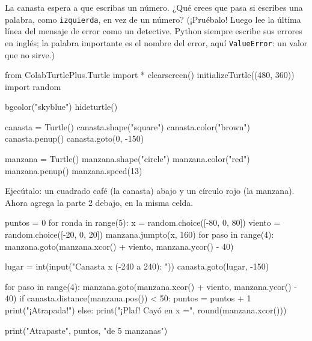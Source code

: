 \begin{think}
La canasta espera a que escribas un número. ¿Qué crees que pasa si escribes una palabra, como \texttt{izquierda}, en vez de un número? (¡Pruébalo! Luego lee la última línea del mensaje de error como un detective. Python siempre escribe sus errores en inglés; la palabra importante es el nombre del error, aquí \texttt{ValueError}: un valor que no sirve.)
\end{think}

\begin{typethis}
from ColabTurtlePlus.Turtle import *
clearscreen()
initializeTurtle((480, 360))
import random

bgcolor("skyblue")
hideturtle()

canasta = Turtle()
canasta.shape("square")
canasta.color("brown")
canasta.penup()
canasta.goto(0, -150)

manzana = Turtle()
manzana.shape("circle")
manzana.color("red")
manzana.penup()
manzana.speed(13)
\end{typethis}

Ejecútalo: un cuadrado café (la canasta) abajo y un círculo rojo (la manzana). Ahora agrega la parte 2 debajo, en la misma celda.

\lstset{firstnumber=21}
\begin{typethis}
puntos = 0
for ronda in range(5):
    x = random.choice([-80, 0, 80])
    viento = random.choice([-20, 0, 20])
    manzana.jumpto(x, 160)
    for paso in range(4):
        manzana.goto(manzana.xcor() + viento,
                     manzana.ycor() - 40)

    lugar = int(input("Canasta x (-240 a 240): "))
    canasta.goto(lugar, -150)

    for paso in range(4):
        manzana.goto(manzana.xcor() + viento,
                     manzana.ycor() - 40)
    if canasta.distance(manzana.pos()) < 50:
        puntos = puntos + 1
        print("¡Atrapada!")
    else:
        print("¡Plaf! Cayó en x =",
              round(manzana.xcor()))

print("Atrapaste", puntos, "de 5 manzanas")
\end{typethis}
\lstset{firstnumber=1}

